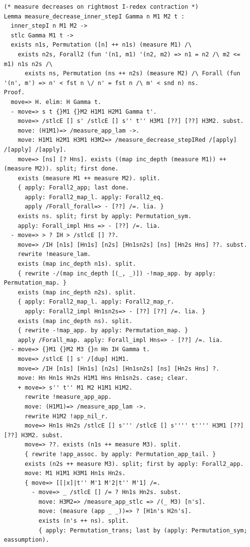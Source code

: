 \begin{lstlisting}[style=authorcoq]
(* measure decreases on rightmost I-redex contraction *)
Lemma measure_decrease_inner_stepI Gamma n M1 M2 t :
  inner_stepI n M1 M2 ->
  stlc Gamma M1 t ->
  exists n1s, Permutation ([n] ++ n1s) (measure M1) /\
    exists n2s, Forall2 (fun '(n1, m1) '(n2, m2) => n1 = n2 /\ m2 <= m1) n1s n2s /\
      exists ns, Permutation (ns ++ n2s) (measure M2) /\ Forall (fun '(n', m') => n' < fst n \/ n' = fst n /\ m' < snd n) ns.
Proof.
  move=> H. elim: H Gamma t.
  - move=> s t {}M1 {}M2 H1M1 H2M1 Gamma t'.
    move=> /stlcE [] s' /stlcE [] s'' t'' H3M1 [??] [??] H3M2. subst.
    move: (H1M1)=> /measure_app_lam ->.
    move: H1M1 H2M1 H3M1 H3M2=> /measure_decrease_stepIRed /[apply] /[apply] /[apply].
    move=> [ns] [? Hns]. exists ((map inc_depth (measure M1)) ++ (measure M2)). split; first done.
    exists (measure M1 ++ measure M2). split.
    { apply: Forall2_app; last done.
      apply: Forall2_map_l. apply: Forall2_eq.
      apply /Forall_forall=> - [??] /=. lia. }
    exists ns. split; first by apply: Permutation_sym.
    apply: Forall_impl Hns => - [??] /=. lia.
  - move=> > ? IH > /stlcE [] ??.
    move=> /IH [n1s] [Hn1s] [n2s] [Hn1sn2s] [ns] [Hn2s Hns] ??. subst.
    rewrite !measure_lam.
    exists (map inc_depth n1s). split.
    { rewrite -/(map inc_depth [(_, _)]) -!map_app. by apply: Permutation_map. }
    exists (map inc_depth n2s). split.
    { apply: Forall2_map_l. apply: Forall2_map_r.
      apply: Forall2_impl Hn1sn2s=> - [??] [??] /=. lia. }
    exists (map inc_depth ns). split.
    { rewrite -!map_app. by apply: Permutation_map. }
    apply /Forall_map. apply: Forall_impl Hns=> - [??] /=. lia.
  - move=> {}M1 {}M2 M3 {}n Hn IH Gamma t.
    move=> /stlcE [] s' /[dup] H1M1.
    move=> /IH [n1s] [Hn1s] [n2s] [Hn1sn2s] [ns] [Hn2s Hns] ?.
    move: Hn Hn1s Hn2s H1M1 Hns Hn1sn2s. case; clear.
    + move=> s'' t'' M1 M2 H1M1 H1M2.
      rewrite !measure_app_app.
      move: (H1M1)=> /measure_app_lam ->.
      rewrite H1M2 !app_nil_r.
      move=> Hn1s Hn2s /stlcE [] s''' /stlcE [] s'''' t'''' H3M1 [??] [??] H3M2. subst.
      move=> ??. exists (n1s ++ measure M3). split.
      { rewrite !app_assoc. by apply: Permutation_app_tail. }
      exists (n2s ++ measure M3). split; first by apply: Forall2_app.
      move: M1 H1M1 H3M1 Hn1s Hn2s.
      { move=> [[|x]|t'' M'1 M'2|t'' M'1] /=.
        - move=> _ /stlcE [] /= ? Hn1s Hn2s. subst.
          move: H3M2=> /measure_app_stlc => /(_ M3) [n's].
          move: (measure (app _ _))=> ? [H1n's H2n's].
          exists (n's ++ ns). split.
          { apply: Permutation_trans; last by (apply: Permutation_sym; eassumption).

\end{lstlisting}
